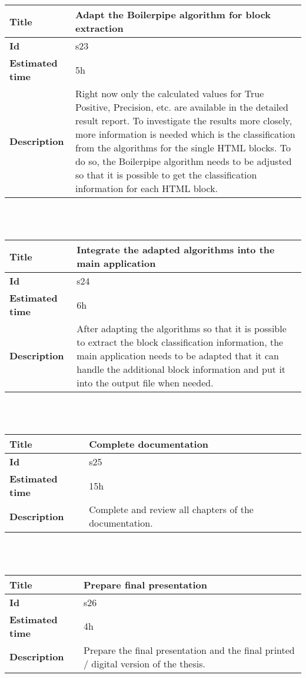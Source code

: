    \begin{tabular}{ | p{4cm} | p{10cm} |}
    \hline
    \textbf{Title} & Adapt the Boilerpipe algorithm for block extraction\\ \hline
    \textbf{Id} & s23\\ \hline
    \textbf{Estimated time} & 5h \\ \hline
    \textbf{Description} &  Right now only the calculated values for True Positive, Precision, etc. are available in the detailed result report. To investigate the results more closely, more information is needed which is the classification from the algorithms for the single HTML blocks. To do so, the Boilerpipe algorithm needs to be adjusted so that it is possible to get the classification information for each HTML block.\\ 
    \hline
    \end{tabular} \\\\


     \begin{tabular}{ | p{4cm} | p{10cm} |}
    \hline
    \textbf{Title} & Integrate the adapted algorithms into the main application\\ \hline
    \textbf{Id} & s24\\ \hline
    \textbf{Estimated time} & 6h \\ \hline
    \textbf{Description} &  After adapting the algorithms so that it is possible to extract the block classification information, the main application needs to be adapted that it can handle the additional block information and put it into the output file when needed.\\ 
    \hline
    \end{tabular} \\\\


    \begin{tabular}{ | p{4cm} | p{10cm} |}
    \hline
    \textbf{Title} & Complete documentation\\ \hline
    \textbf{Id} & s25\\ \hline
    \textbf{Estimated time} & 15h \\ \hline
    \textbf{Description} &  Complete and review all chapters of the documentation.  \\ 
    \hline
    \end{tabular} \\\\

    \begin{tabular}{ | p{4cm} | p{10cm} |}
    \hline
    \textbf{Title} & Prepare final presentation\\ \hline
    \textbf{Id} & s26\\ \hline
    \textbf{Estimated time} & 4h \\ \hline
    \textbf{Description} &  Prepare the final presentation and the final printed / digital version of the thesis.  \\ 
    \hline
    \end{tabular} \\\\






